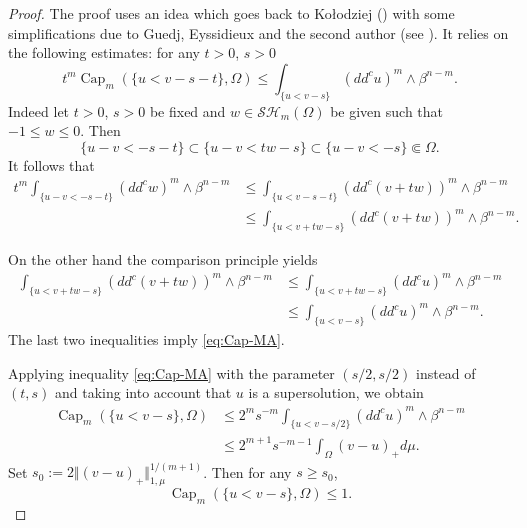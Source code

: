 \documentclass[JEP,XML,SOM,Unicode]{cedram}
\theoremstyle{definition}
\DeclareMathOperator{\Capa}{Cap}
\begin{document}
\begin{proof}
The proof uses an idea which goes back to Ko\l odziej (\cite{Kol96}) with some simplifications due to Guedj, Eyssidieux and the second author (see \cite{EGZ09, GKZ08}). It relies on the following estimates: for any $t > 0$, $s > 0$
\begin{equation}\label{eq:Cap-MA}
t^m \Capa_m(\{u< v -s-t\},\Omega)\leq \int_{\{u<v -s\}}(dd^cu)^m\wedge\beta^{n-m}.
\end{equation}
Indeed let $t > 0$, $s > 0$ be fixed and $ w \in \mathcal{SH}_m(\Omega)$ be given such that $-1 \leq w \leq0$. Then
\[\{u-v<-s-t\}\subset\{u-v< t w -s\} \subset\{u-v<-s\} \Subset\Omega.\]
It follows that
\begin{align*}
t^m \int_{\{u-v<-s-t\}}(dd^c w)^m\wedge\beta^{n-m}&\leq\int_{\{u< v - s-t\}}(dd^c(v+tw))^m\wedge\beta^{n-m}\\
&\leq \int_{\{u< v+ tw - s\}}(dd^c(v+tw))^m\wedge\beta^{n-m}.
\end{align*}

On the other hand the comparison principle yields
\begin{align*}
\int_{\{u< v+ tw - s\}}(dd^c(v+tw))^m\wedge\beta^{n-m} &\leq\int_{\{u < v +t w - s\}}(dd^c u)^m\wedge\beta^{n-m}\\
&\leq\int_{\{u< v -s\}}(dd^cu)^m\wedge\beta^{n-m}.
\end{align*}
The last two inequalities imply \eqref{eq:Cap-MA}.

Applying inequality \eqref{eq:Cap-MA} with the parameter $(s \slash 2, s\slash 2)$ instead of $(t,s)$ and taking into account that $u$ is a supersolution, we obtain
\[
\begin{split}
\Capa_m(\{u< v - s \},\Omega) & \leq 2^m s^{-m} \int_{\{u<v - s\slash 2\}}(dd^cu)^m\wedge\beta^{n-m} \\
& \leq 2^{m + 1} s^{-m - 1} \int_\Omega (v-u)_+ d \mu.
\end{split}
\]
Set $s_0:= 2 \Vert (v-u)_+\Vert_{1,\mu}^{1 \slash (m+1)}$. Then for any $s \geq s_0$,
\begin{equation} \label{eq:smallcap}
\Capa_m(\{u< v - s \},\Omega)\leq 1.
\end{equation}


\end{proof}
\end{document}
